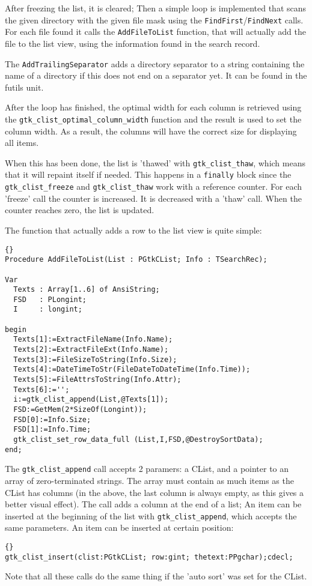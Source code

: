 \documentclass[10pt]{article}
\newcommand{\file}[1]{\textsf{#1}}
\begin{document}
After freezing the list, it is cleared; Then a simple loop is implemented
that scans the given directory with the given file mask using the
\lstinline|FindFirst|/\lstinline|FindNext| calls. For each file found
it calls the \lstinline|AddFileToList| function, that will actually add the
file to the list view, using the information found in the search record.

The \lstinline|AddTrailingSeparator| adds a directory separator to a 
string containing the name of a directory if this does not end on a 
separator yet. It can be found in the \file{futils} unit.

After the loop has finished, the optimal width for each column is 
retrieved using the \lstinline|gtk_clist_optimal_column_width| function
and the result is used to set the column width. As a result, the columns will
have the correct size for displaying all items.

When this has been done, the list is 'thawed' with \lstinline|gtk_clist_thaw|,
which means that it will repaint itself if needed. This happens in a 
\lstinline|finally| block since the \lstinline|gtk_clist_freeze| and 
\lstinline|gtk_clist_thaw| work with a reference counter. For each 'freeze' 
call the counter is increased. It is decreased with a 'thaw' call. When the
counter reaches zero, the list is updated.

The function that actually adds a row to the list view is quite simple:
\begin{lstlisting}{}
Procedure AddFileToList(List : PGtkCList; Info : TSearchRec);

Var
  Texts : Array[1..6] of AnsiString;
  FSD   : PLongint;
  I     : longint;
      
begin
  Texts[1]:=ExtractFileName(Info.Name);
  Texts[2]:=ExtractFileExt(Info.Name);
  Texts[3]:=FileSizeToString(Info.Size);
  Texts[4]:=DateTimeToStr(FileDateToDateTime(Info.Time));
  Texts[5]:=FileAttrsToString(Info.Attr);
  Texts[6]:='';
  i:=gtk_clist_append(List,@Texts[1]);
  FSD:=GetMem(2*SizeOf(Longint));
  FSD[0]:=Info.Size;
  FSD[1]:=Info.Time;
  gtk_clist_set_row_data_full (List,I,FSD,@DestroySortData);
end;
\end{lstlisting}
The \lstinline|gtk_clist_append| call accepts 2 paramers: a CList, and a
pointer to an array of zero-terminated strings. The array must contain as
much items as the CList has columns (in the above, the last column is 
always empty, as this gives a better visual effect). The call adds a column
at the end of a list; An item can be inserted at the beginning of the list
with \lstinline|gtk_clist_append|, which accepts the same parameters. An
item can be inserted at certain position:
\begin{lstlisting}{}
gtk_clist_insert(clist:PGtkCList; row:gint; thetext:PPgchar);cdecl;
\end{lstlisting}
Note that all these calls do the same thing if the 'auto sort' was set for
the CList.
\end{document}
